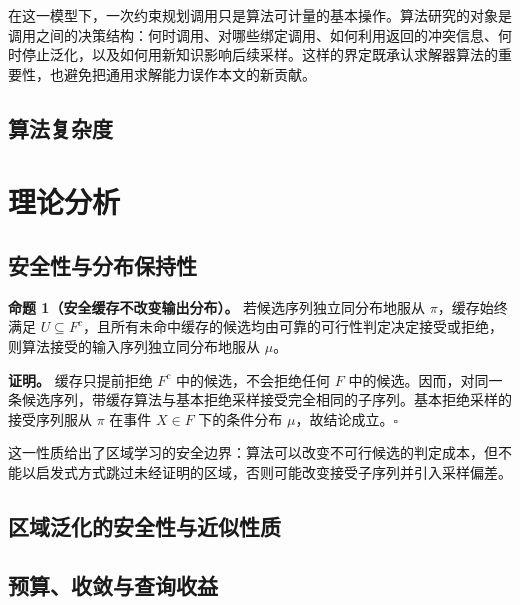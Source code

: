 \documentclass[UTF8, fontset=none, a4paper, 12pt]{ctexart}
\begin{document}
在这一模型下，一次约束规划调用只是算法可计量的基本操作。算法研究的对象是调用之间的决策结构：何时调用、对哪些绑定调用、如何利用返回的冲突信息、何时停止泛化，以及如何用新知识影响后续采样。这样的界定既承认求解器算法的重要性，也避免把通用求解能力误作本文的新贡献。

\subsection{算法复杂度}


\section{理论分析}

\subsection{安全性与分布保持性}

\textbf{命题 1（安全缓存不改变输出分布）。}
若候选序列独立同分布地服从 $\pi$，缓存始终满足 $U\subseteq F^c$，且所有未命中缓存的候选均由可靠的可行性判定决定接受或拒绝，则算法接受的输入序列独立同分布地服从 $\mu$。

\textbf{证明。}
缓存只提前拒绝 $F^c$ 中的候选，不会拒绝任何 $F$ 中的候选。因而，对同一条候选序列，带缓存算法与基本拒绝采样接受完全相同的子序列。基本拒绝采样的接受序列服从 $\pi$ 在事件 $X\in F$ 下的条件分布 $\mu$，故结论成立。\hfill$\square$

这一性质给出了区域学习的安全边界：算法可以改变不可行候选的判定成本，但不能以启发式方式跳过未经证明的区域，否则可能改变接受子序列并引入采样偏差。

\subsection{区域泛化的安全性与近似性质}


\subsection{预算、收敛与查询收益}

\end{document}
